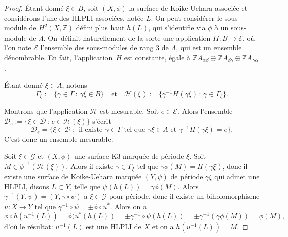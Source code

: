 \documentclass[JEP,XML,SOM,Unicode,francais,published]{cedram}
\newcommand{\Z}{\mathbb{Z}}
\theoremstyle{definition}
\begin{document}
\begin{proof}
Étant donné $\xi \in B$, soit $(X, \phi)$ la surface de Koike-Uehara associée et considérons l'une des HLPLI associées, notée $L$. On peut considérer le sous-module de $H^2(X, \Z)$ défini plus haut $h(L)$, qui s'identifie via $\phi$ à un sous-module de $\Lambda$. On~définit naturellement de la sorte une application $H \colon B \to \mathscr{E}$, où l'on note $\mathscr{E}$ l'ensemble des sous-modules de rang $3$ de $\Lambda$, qui est un ensemble dénombrable. En fait, l'application~$H$ est constante, égale à $\Z A_{\alpha\beta} \oplus \Z A_{\beta\gamma} \oplus \Z A_{\gamma\alpha}$.

Étant donné $\xi\in A$, notons
\[
\Gamma_\xi:= \{\gamma\in\Gamma\,:\,\gamma\xi \in B\}\quad\text{et}\quad\mathscr{H}(\xi):= \{\gamma^{-1}H(\gamma\xi)\,:\,\gamma\in\Gamma_\xi\}.
\]

Montrons que l'application $\mathscr{H}$ est mesurable. Soit $e \in \mathscr{E}$. Alors l'ensemble $\mathscr{D}_e:= \{\xi \in \mathscr{D}\,:\,e \in \mathscr{H}(\xi)\}$ s'écrit
\[\mathscr{D}_e = \{\xi\in \mathscr{D}\,:\,\text{ il existe } \gamma \in \Gamma \text{ tel que } \gamma\xi \in A \text{ et } \gamma^{-1}H(\gamma\xi) = e\}.\]
C'est donc un ensemble mesurable.

Soit $\xi \in \mathscr{G}$ et $(X, \phi)$ une surface K3 marquée de période $\xi$. Soit $M \in \phi^{-1}\left(\mathscr{H}(\xi)\right)$. Alors il existe $\gamma \in \Gamma_\xi$ tel que $\gamma \phi(M) = H(\gamma\xi)$, donc il existe une surface de Koike-Uehara marquée $(Y, \psi)$ de période $\gamma\xi$ qui admet une HLPLI, disons $L \subset Y$, telle que $\psi(h(L)) = \gamma \phi(M)$. Alors $\gamma^{-1}(Y, \psi) = (Y, \gamma\circ\psi)$ a $\xi \in \mathscr{G}$ pour période, donc il existe un biholomorphisme $u \colon X \to Y$ tel que $\gamma^{-1} \circ\psi = \pm\phi \circ u^{*}$.
Alors on a
\[\phi \circ h(u^{-1}(L)) = \phi(u^{*}(h(L)) = \pm\gamma^{-1}\circ\psi(h(L)) = \pm \gamma^{-1}\left(\gamma \phi(M)\right) = \phi(M),\]
d'où le résultat: $u^{-1}(L)$ est une HLPLI de $X$ et on a $h(u^{-1}(L)) = M$.
\end{proof}
\end{document}
